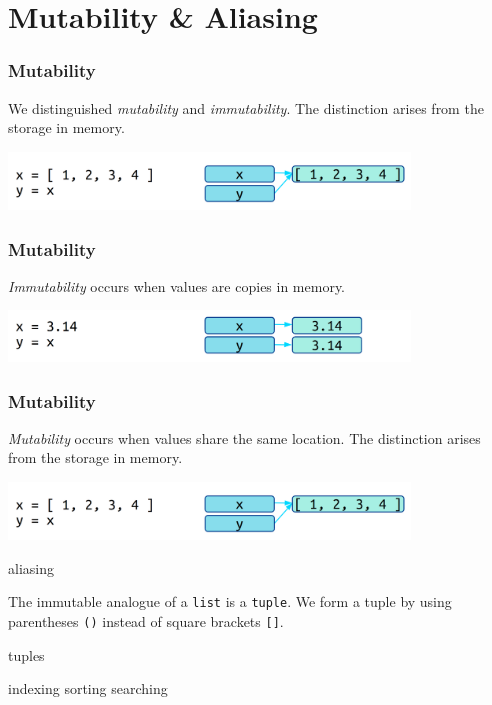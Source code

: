 \documentclass[11pt]{beamer}
\begin{document}
\section{Mutability \& Aliasing}

\begin{frame}[fragile]
  \frametitle{Mutability}
  \Enlarge

  \begin{itemize}
  \myitem  We distinguished \emph{mutability} and \emph{immutability}.
  \myitem  The distinction arises from the storage in memory.
  \end{itemize}
  \includegraphics[width=0.8\textwidth]{./img/memory-mutability.png}
\end{frame}

\begin{frame}[fragile]
  \frametitle{Mutability}
  \Enlarge

  \begin{itemize}
  \myitem  \emph{Immutability} occurs when values are copies in memory.
  \end{itemize}
  \includegraphics[width=0.8\textwidth]{./img/memory-immutability.png}
\end{frame}

\begin{frame}[fragile]
  \frametitle{Mutability}
  \Enlarge

  \begin{itemize}
  \myitem  \emph{Mutability} occurs when values share the same location.
  \myitem  The distinction arises from the storage in memory.
  \end{itemize}
  \includegraphics[width=0.8\textwidth]{./img/memory-mutability.png}
\end{frame}

aliasing

  \myitem  The immutable analogue of a \texttt{list} is a \texttt{tuple}.
  \myitem  We form a tuple by using parentheses \texttt{()} instead of square brackets \texttt{[]}.

tuples

indexing
sorting
searching
\end{document}
